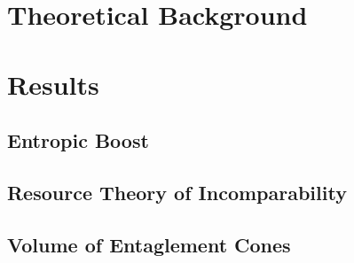\documentclass[a4paper, 11pt]{report}
\begin{document}
\renewcommand*{\familydefault}{lmss}
\renewcommand*{\rmdefault}{lmss}

\frontmatter






\renewcommand*{\familydefault}{lmr}
\renewcommand*{\rmdefault}{lmr}

%






\setcounter{tocdepth}{2}
\tableofcontents

\newpage
\mainmatter

\part{Theoretical Background}





\part{Results}

\chapter{Entropic Boost}

\chapter{Resource Theory of Incomparability}

\chapter{Volume of Entaglement Cones}








\backmatter


\printbibliography


  
\end{document}
